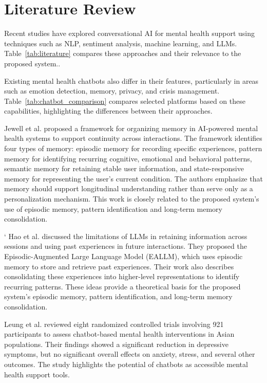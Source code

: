 \documentclass[conference]{IEEEtran}
\begin{document}
\section{Literature Review}
Recent studies have explored conversational AI for mental health support using techniques such as NLP, sentiment analysis, machine learning, and LLMs. Table~\ref{tab:literature} compares these approaches and their relevance to the proposed system..

Existing mental health chatbots also differ in their features, particularly in areas such as emotion detection, memory, privacy, and crisis management. Table~\ref{tab:chatbot_comparison} compares selected platforms based on these capabilities, highlighting the differences between their approaches.

Jewell et al. \cite{b9} proposed a framework for organizing memory in AI-powered mental health systems to support continuity across interactions. The framework identifies four types of memory: episodic memory for recording specific experiences, pattern memory for identifying recurring cognitive, emotional and behavioral patterns, semantic memory for retaining stable user information, and state-responsive memory for representing the user's current condition. The authors emphasize that memory should support longitudinal understanding rather than serve only as a personalization mechanism. This work is closely related to the proposed system's use of episodic memory, pattern identification and long-term memory consolidation.

`
Hao et al. \cite{b10} discussed the limitations of LLMs in retaining information across sessions and using past experiences in future interactions. They proposed the Episodic-Augmented Large Language Model (EALLM), which uses episodic memory to store and retrieve past experiences. Their work also describes consolidating these experiences into higher-level representations to identify recurring patterns. These ideas provide a theoretical basis for the proposed system's episodic memory, pattern identification, and long-term memory consolidation.

Leung et al. \cite{b11} reviewed eight randomized controlled trials involving 921 participants to assess chatbot-based mental health interventions in Asian populations. Their findings showed a significant reduction in depressive symptoms, but no significant overall effects on anxiety, stress, and several other outcomes. The study highlights the potential of chatbots as accessible mental health support tools.
\end{document}
